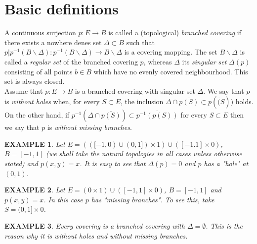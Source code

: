\documentclass{article}
\begin{document}
\newtheorem{example}{EXAMPLE}

\newtheorem{definition}{Definition}[section]
\newtheorem{proposition}[definition]{Proposition}
\newtheorem{corollary}[definition]{Corollary}
\newtheorem{lemma}[definition]{Lemma}
\newtheorem{theorem}[definition]{Theorem}


\section{Basic definitions}%

 A continuous surjection $p : E \to B$ is called a (topological) \emph{branched covering} if there exists a nowhere denes set $\Delta \subset B$ such that  $p|p^{-1}(B\backslash\Delta):p^{-1}(B\backslash\Delta)\to B\backslash\Delta$ is a covering mapping.
The set $B\backslash\Delta$ is called a \emph{regular set} of the branched covering $p$, whereas $\Delta$ its \emph{singular set} $\Delta (p)$ consisting of all points $b \in B$ which have no evenly covered neighbourhood.
This set is always closed.
\\
Assume that $p:E \to B$ is a branched covering with singular set $\Delta$.
We say that $p$ is \emph{without holes} when, for every $S \subset E$, the inclusion $\Delta \cap \overline{p(S)} \subset p(\overline(S))$ holds.
On the other hand, if $p^{-1}(\Delta \cap \overline{p(S)}) \subset \overline{p^{-1}(p(S))}$ for every $S \subset E$ then we say that $p$ is \emph{without missing branches}.
\begin{example}
	Let $E = (([-1,0) \cup (0,1]) \times {1}) \cup ([-1.1] \times {0})$, $B = [-1,1]$ (we shall take the natural topologies in all cases unless otherwise stated) and $p(x,y) = x$. It is easy to see that $\Delta(p) = {0}$ and $p$ has a "hole" at $(0,1)$.
\end{example}
\begin{example}
	Let $E = ({0} \times {1}) \cup ([-1,1] \times {0})$, $B = [-1,1]$ and $p(x,y) = x$. In this case $p$ has "missing branches". To see this, take $S = (0,1] \times {0}$.
\end{example}
\begin{example}
	Every covering is a branched covering with $\Delta = \emptyset$. This is the reason why it is without holes and without missing branches.
\end{example}
\end{document}

